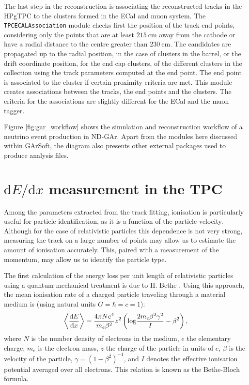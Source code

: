 The last step in the reconstruction is associating the reconstructed tracks in the HPgTPC to the clusters formed in the ECal and muon system. The \texttt{TPCECALAssociation} module checks first the position of the track end points, considering only the points that are at least $215~\mathrm{cm}$ away from the cathode or have a radial distance to the centre greater than $230~\mathrm{cm}$. The candidates are propagated up to the radial position, in the case of clusters in the barrel, or the drift coordinate position, for the end cap clusters, of the different clusters in the collection using the track parameters computed at the end point. The end point is associated to the cluster if certain proximity criteria are met. This module creates associations between the tracks, the end points and the clusters. The criteria for the associations are slightly different for the ECal and the muon tagger.

Figure \ref{fig:gar_workflow} shows the simulation and reconstruction workflow of a neutrino event production in ND-GAr. Apart from the modules here discussed within GArSoft, the diagram also presents other external packages used to produce analysis files.

\section[\texorpdfstring{$\mathrm{d}E/\mathrm{d}x$}{dE/dx} measurement in the TPC]{\boldmath\texorpdfstring{$\mathrm{d}E/\mathrm{d}x$}{dE/dx} measurement in the TPC}\label{section:dEdx}

Among the parameters extracted from the track fitting, ionisation is particularly useful for particle identification, as it is a function of the particle velocity. Although for the case of relativistic particles this dependence is not very strong, measuring the track on a large number of points may allow us to estimate the amount of ionisation accurately. This, paired with a measurement of the momentum, may allow us to identify the particle type.

The first calculation of the energy loss per unit length of relativistic particles using a quantum-mechanical treatment is due to H. Bethe \cite{Bethe1930}. Using this approach, the mean ionisation rate of a charged particle traveling through a material medium is (using natural units $G=\hbar=c=1$):
\begin{equation}\label{Eq:3.1}
    \expval{\frac{\mathrm{d}E}{\mathrm{d}x}} = \frac{4 \pi N e^{4}}{m_{e}\beta^{2}} z^{2} \left(\mathrm{log} \frac{2m_{e}\beta^{2}\gamma^{2}}{I} - \beta^{2}\right),
\end{equation}
where $N$ is the number density of electrons in the medium, $e$ the elementary charge, $m_{e}$ is the electron mass, $z$ the charge of the particle in units of $e$, $\beta$ is the velocity of the particle, $\gamma = (1-\beta^{2})^{-1}$, and $I$ denotes the effective ionisation potential averaged over all electrons. This relation is known as the Bethe-Bloch formula.

